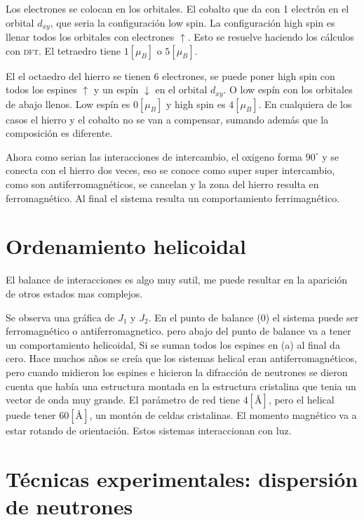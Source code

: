 \documentclass[11pt,fleqn]{book}
\begin{document}

Los electrones se colocan en los orbitales. El cobalto que da con 1 electrón en el orbital $d_{xy}$, que seria la configuración low spin. La configuración high spin es llenar todos los orbitales con electrones $\uparrow$. Esto se resuelve haciendo los cálculos con \textsc{dft}. El tetraedro tiene $1 [\mu_{B}]$ o $5[\mu_{B}]$.


El el octaedro del hierro se tienen 6 electrones, se puede poner high spin con todos los espines $\uparrow$ y un espín $\downarrow$ en el orbital $d_{xy}$. O low espín con los orbitales de abajo llenos. Low espín es $0[\mu_{B}]$ y high spin es $4 [\mu_{B}]$.  En cualquiera de los casos el hierro y el cobalto no se van a compensar, sumando además que la composición es diferente. 

Ahora como serian las interacciones de intercambio, el oxigeno forma $90^{\circ}$ y se conecta con el hierro dos veces, eso se conoce como super super intercambio, como son antiferromagnéticos, se cancelan y la zona del hierro resulta en ferromagnético. Al final el sistema resulta un comportamiento ferrimagnético.

\section{Ordenamiento helicoidal}

El balance de interacciones es algo muy sutil, me puede resultar en la aparición  de otros estados mas complejos.


Se observa una gráfica de $J_{1}$ y $J_{2}$. En el punto de balance (0) el sistema puede ser ferromagnético o antiferromagnetico. pero abajo del punto de balance va a tener un comportamiento helicoidal, Si se suman todos los espines en (a) al final da cero. Hace muchos años se creía que los sistemas helical eran antiferromagnéticos, pero cuando midieron los espines e hicieron la difracción de neutrones se dieron cuenta que había una estructura montada en la estructura cristalina que tenia un vector de onda muy grande. El parámetro de red tiene $4 [\si{\angstrom}]$, pero el helical puede tener $60 [\si{\angstrom}]$, un montón de celdas cristalinas. El momento magnético va a estar rotando de orientación. Estos sistemas interaccionan con luz.

\section{Técnicas experimentales: dispersión de neutrones}
\end{document}
